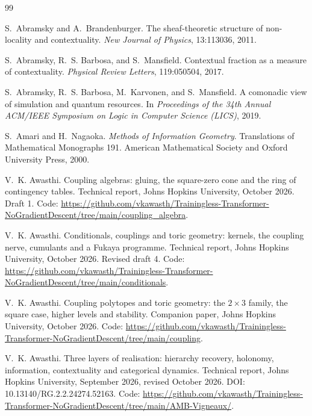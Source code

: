 \documentclass[11pt]{article}
\theoremstyle{definition}
\theoremstyle{remark}
\begin{document}
\begin{thebibliography}{99}

S.~Abramsky and A.~Brandenburger.
\newblock The sheaf-theoretic structure of non-locality and contextuality.
\newblock \emph{New Journal of Physics}, 13:113036, 2011.

S.~Abramsky, R.~S. Barbosa, and S.~Mansfield.
\newblock Contextual fraction as a measure of contextuality.
\newblock \emph{Physical Review Letters}, 119:050504, 2017.

S.~Abramsky, R.~S. Barbosa, M.~Karvonen, and S.~Mansfield.
\newblock A comonadic view of simulation and quantum resources.
\newblock In \emph{Proceedings of the 34th Annual ACM/IEEE Symposium on Logic in Computer Science
  (LICS)}, 2019.

S.~Amari and H.~Nagaoka.
\newblock \emph{Methods of Information Geometry}.
\newblock Translations of Mathematical Monographs 191. American Mathematical Society and Oxford
University Press, 2000.

V.~K. Awasthi.
\newblock Coupling algebras: gluing, the square-zero cone and the ring of contingency tables.
\newblock Technical report, Johns Hopkins University, October 2026. Draft 1. Code: \url{https://github.com/vkawasth/Trainingless-Transformer-NoGradientDescent/tree/main/coupling_algebra}.

V.~K. Awasthi.
\newblock Conditionals, couplings and toric geometry: kernels, the coupling nerve, cumulants and a {F}ukaya
programme.
\newblock Technical report, Johns Hopkins University, October 2026. Revised draft 4. Code: \url{https://github.com/vkawasth/Trainingless-Transformer-NoGradientDescent/tree/main/conditionals}.

V.~K. Awasthi.
\newblock Coupling polytopes and toric geometry: the $2\times3$ family, the square case, higher levels and stability.
\newblock Companion paper, Johns Hopkins University, October 2026. Code: \url{https://github.com/vkawasth/Trainingless-Transformer-NoGradientDescent/tree/main/coupling}.

V.~K. Awasthi.
\newblock Three layers of realisation: hierarchy recovery, holonomy, information, contextuality and categorical dynamics.
\newblock Technical report, Johns Hopkins University, September 2026, revised October 2026.
\newblock DOI: 10.13140/RG.2.2.24274.52163. Code: \url{https://github.com/vkawasth/Trainingless-Transformer-NoGradientDescent/tree/main/AMB-Vigneaux/}.


\end{thebibliography}
\end{document}
